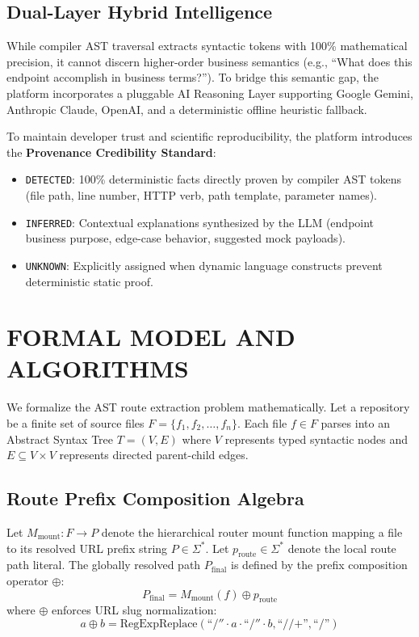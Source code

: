\documentclass[a4paper,10pt]{article}
\begin{document}
\subsection{Dual-Layer Hybrid Intelligence}
\noindent
While compiler AST traversal extracts syntactic tokens with 100\% mathematical precision, it cannot discern higher-order business semantics (e.g., ``What does this endpoint accomplish in business terms?''). To bridge this semantic gap, the platform incorporates a pluggable AI Reasoning Layer supporting Google Gemini, Anthropic Claude, OpenAI, and a deterministic offline heuristic fallback.

To maintain developer trust and scientific reproducibility, the platform introduces the \textbf{Provenance Credibility Standard}:
\begin{itemize}
  \setlength{\itemsep}{1pt}
  \item \texttt{DETECTED}: 100\% deterministic facts directly proven by compiler AST tokens (file path, line number, HTTP verb, path template, parameter names).
  \item \texttt{INFERRED}: Contextual explanations synthesized by the LLM (endpoint business purpose, edge-case behavior, suggested mock payloads).
  \item \texttt{UNKNOWN}: Explicitly assigned when dynamic language constructs prevent deterministic static proof.
\end{itemize}

\section{FORMAL MODEL AND ALGORITHMS}
\noindent
We formalize the AST route extraction problem mathematically. Let a repository be a finite set of source files $F = \{f_1, f_2, \dots, f_n\}$. Each file $f \in F$ parses into an Abstract Syntax Tree $T = (V, E)$ where $V$ represents typed syntactic nodes and $E \subseteq V \times V$ represents directed parent-child edges.

\subsection{Route Prefix Composition Algebra}
\noindent
Let $M_{\text{mount}}: F \to P$ denote the hierarchical router mount function mapping a file to its resolved URL prefix string $P \in \Sigma^*$. Let $p_{\text{route}} \in \Sigma^*$ denote the local route path literal. The globally resolved path $P_{\text{final}}$ is defined by the prefix composition operator $\oplus$:
\begin{equation}
P_{\text{final}} = M_{\text{mount}}(f) \oplus p_{\text{route}}
\end{equation}
where $\oplus$ enforces URL slug normalization:
\begin{equation}
a \oplus b = \text{RegExpReplace}\left( \text{``/}'' \cdot a \cdot \text{``/}'' \cdot b, \text{``//+''}, \text{``/''} \right)
\end{equation}
\end{document}
